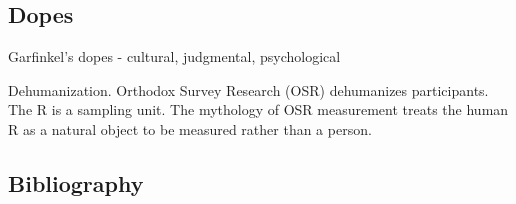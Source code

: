 \documentclass[11pt,twoside]{article}
\begin{document}
\subsection{Dopes}

Garfinkel's dopes - cultural, judgmental, psychological

Dehumanization.  Orthodox Survey Research (OSR) dehumanizes
participants.  The R is a sampling unit.  The mythology of OSR
measurement treats the human R as a natural object to be measured
rather than a person.


\clearpage
\appendix
\begin{appendices}
\section{Bibliography}
\printbibliography[heading=none]
\end{appendices}
\end{document}
